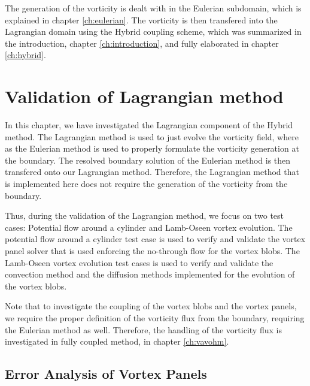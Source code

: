 The generation of the vorticity is dealt with in the Eulerian subdomain, which is explained in chapter \ref{ch:eulerian}. The vorticity is then transfered into the Lagrangian domain using the Hybrid coupling scheme, which was summarized in the introduction, chapter \ref{ch:introduction}, and fully elaborated in chapter \ref{ch:hybrid}.

%
\section{Validation of Lagrangian method}
\label{sec:volm}
In this chapter, we have investigated the Lagrangian component of the Hybrid method. The Lagrangian method is used to just evolve the vorticity field, where as the Eulerian method is used to properly formulate the vorticity generation at the boundary. The resolved boundary solution of the Eulerian method is then transfered onto our Lagrangian method. Therefore, the Lagrangian method that is implemented here does not require the generation of the vorticity from the boundary. 

Thus, during the validation of the Lagrangian method, we focus on two test cases: Potential flow around a cylinder and Lamb-Oseen vortex evolution. The potential flow around a cylinder test case is used to verify and validate the vortex panel solver that is used enforcing the no-through flow for the vortex blobs. The Lamb-Oseen vortex evolution test cases is used to verify and validate the convection method and the diffusion methods implemented for the evolution of the vortex blobs.

Note that to investigate the coupling of the vortex blobs and the vortex panels, we require the proper definition of the vorticity flux from the boundary, requiring the Eulerian method as well. Therefore, the handling of the vorticity flux is investigated in fully coupled method, in chapter \ref{ch:vavohm}.


\subsection{Error Analysis of Vortex Panels}


